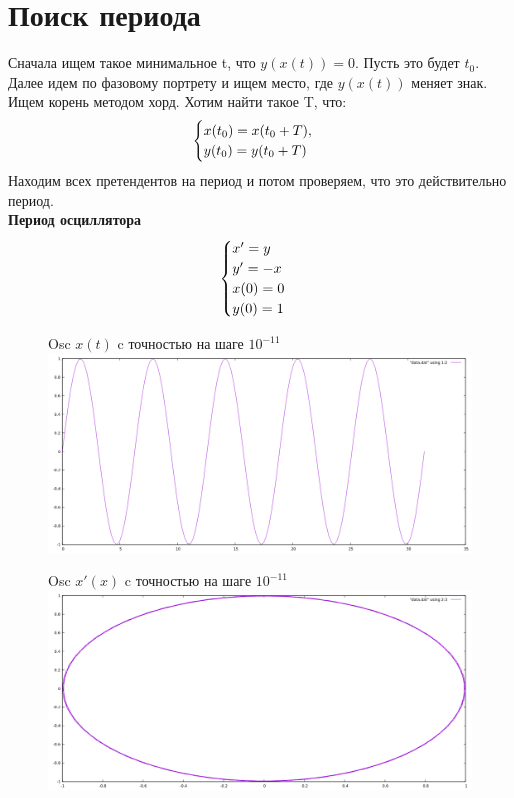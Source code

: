 \documentclass[12pt, a4paper] {report}
\theoremstyle{remark}
\theoremstyle{definition}
\begin{document}
\section{Поиск периода}
Сначала ищем такое минимальное t, что $y(x(t)) = 0$. Пусть это будет $t_0$. Далее идем по фазовому портрету и ищем место, где $y(x(t))$ меняет знак. Ищем корень методом хорд. Хотим найти такое T, что:
\begin{gather}
\begin{cases}
\notag x(t_0) = x(t_0 + T), \\
\notag y(t_0) = y(t_0 + T)
\end{cases}
\end{gather}
Находим всех претендентов на период и потом проверяем, что это действительно период.
\\
\textbf{Период осциллятора}
\begin{gather}
\begin{cases}
\notag x' = y \\
\notag y' = -x \\
\notag x(0) = 0 \\
\notag y(0) = 1
\end{cases}
\end{gather}
\begin{figure}[h!]
 Osc $x(t)$ c точностью на шаге $10^{-11}$\\
\centering
\includegraphics[width=1\linewidth]{010pi.png} 
\end{figure}
\begin{figure}[h!]
 Osc $x'(x)$ c точностью на шаге $10^{-11}$\\
\centering
\includegraphics[width=1\linewidth]{010pi23.png} 
\end{figure}
\end{document}
